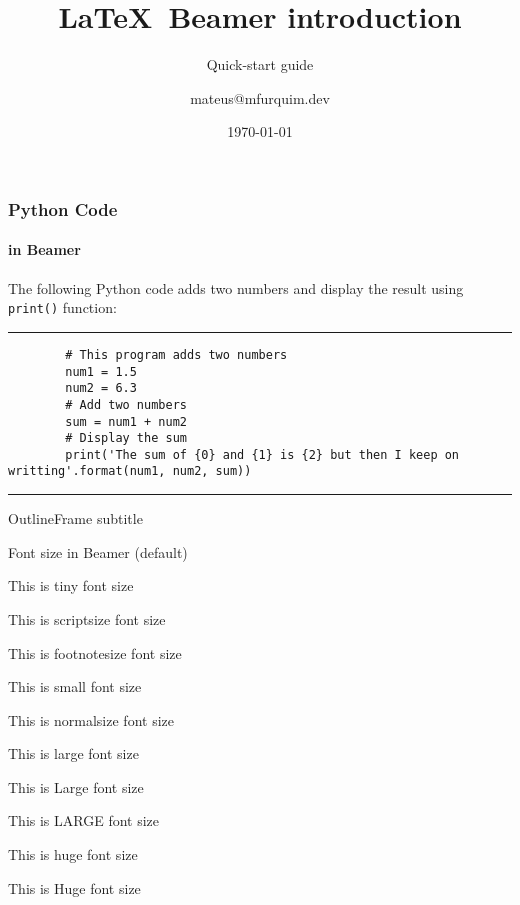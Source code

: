 \documentclass{beamer}
\title{\LaTeX\ Beamer introduction}
\subtitle{Quick-start guide}
\author{mateus@mfurquim.dev}
\institute{MFurquim Dev}
\date{\today}
\begin{document}

\begin{frame}
    \titlepage
\end{frame}




\begin{frame}[fragile]
	\frametitle{Python Code}
	\framesubtitle{in Beamer}
	The following Python code adds two numbers and display the result using \verb|print()| function:
	\rule{\textwidth}{1pt}
	\scriptsize
	\begin{verbatim}
		# This program adds two numbers
		num1 = 1.5
		num2 = 6.3
		# Add two numbers
		sum = num1 + num2
		# Display the sum
		print('The sum of {0} and {1} is {2} but then I keep on writting'.format(num1, num2, sum))
	\end{verbatim}
	\rule{\textwidth}{1pt}
\end{frame}

\begin{frame}[noframenumbering,fragile=singleslide,plain]{Outline}{Frame subtitle}
\end{frame}


\begin{frame}{Font size in Beamer (default)}

\tiny This is tiny font size

\scriptsize This is scriptsize font size

\footnotesize This is footnotesize font size

\small This is small font size

\normalsize This is normalsize font size

\large This is large font size

\Large This is Large font size

\LARGE This is LARGE font size

\huge This is huge font size

\Huge This is Huge font size

\end{frame}
\end{document}
